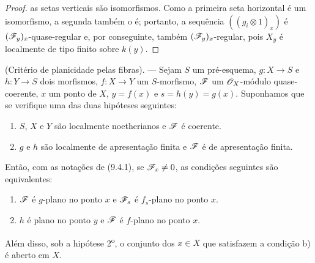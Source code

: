 \begin{proof}

as setas verticais são isomorfismos.
Como a primeira seta horizontal é um
isomorfismo, a segunda também o é;
portanto, a sequência $((g_i\otimes1)_x)$
é $(\mathscr{F}_y)_x$-quase-regular e,
por conseguinte, também
$(\mathscr{F}_y)_x$-regular, pois $X_y$ é
localmente de tipo finito sobre $k(y)$.
\end{proof}

\begin{theorem}[11.3.10]
\label{IV.11.3.10}
(Critério de planicidade pelas fibras). ---
Sejam $S$ um pré-esquema,
$g:X\to S$ e $h:Y\to S$ dois morfismos,
$f:X\to Y$ um $S$-morfismo,
$\mathscr{F}$ um $\mathscr{O}_X$-módulo quase-coerente,
$x$ um ponto de $X$, $y=f(x)$ e
$s=h(y)=g(x)$. Suponhamos que se verifique
uma das duas hipóteses seguintes:
\begin{enumerate}[label=\arabic{enumi}\textsuperscript{o}]
\item $S$, $X$ e $Y$ são localmente noetherianos
e $\mathscr{F}$ é coerente.
\item $g$ e $h$ são localmente de apresentação
finita e $\mathscr{F}$ é de apresentação finita.
\end{enumerate}
Então, com as notações de (9.4.1), se
$\mathscr{F}_x\neq0$, as condições seguintes
são equivalentes:
\begin{enumerate}[label=\emph{\alph*)}]
\item $\mathscr{F}$ é $g$-plano no ponto $x$ e
$\mathscr{F}_s$ é $f_s$-plano no ponto $x$.
\item $h$ é plano no ponto $y$ e $\mathscr{F}$
é $f$-plano no ponto $x$.
\end{enumerate}
Além disso, sob a hipótese
2\textsuperscript{o}, o conjunto dos
$x\in X$ que satisfazem a condição b)
é aberto em $X$.
\end{theorem}


